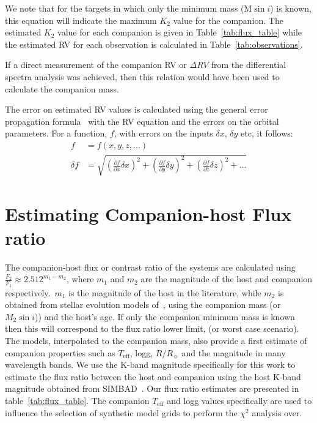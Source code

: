 We note that for the targets in which only the minimum mass (\(\textrm{M}\sin{i} \)) is known, this equation will indicate the maximum \(K_2\) value for the companion. The estimated \(K_2\) value for each companion is given in Table~\ref{tab:flux_table} while the estimated RV for each observation is calculated in Table~\ref{tab:observations}.

If a direct measurement of the companion RV or \(\Delta RV \) from the differential spectra analysis was achieved, then this relation would have been used to calculate the companion mass.

The error on estimated RV values is calculated using the general error propagation formula~\citep{ku_notes_1966} with the RV equation and the errors on the orbital parameters. For a function, \(f\), with errors on the inputs \(\delta x\), \(\delta y\) etc, it follows:
\begin{align}
	f &= f(x, y, z, ...)\\
	\delta f &= \sqrt{{\left( \frac{\partial f}{\partial x} \delta x\right)}^2 +  {\left(\frac{\partial f}{\partial y} \delta y\right)}^2 + {\left(\frac{\partial f}{\partial z} \delta z\right)}^2 + ...}
\end{align}


\section{Estimating Companion-host Flux ratio}

\label{compaion flux ration}
The companion-host flux or contrast ratio of the systems are calculated using \( \frac{F_{2}}{F_{1}} \approx 2.512^{m_{1}-m_{2}} \), where \(m_{1} \) and \(m_{2} \) are the magnitude of the host and companion respectively.\ \(m_{1} \) is the magnitude of the host in the literature, while \(m_{2} \) is obtained from stellar evolution models of~\citet{baraffe_evolutionary_2003, baraffe_new_2015}, using the companion mass (or \(M_{2}\sin{i}\))) and the host's age. If only the companion minimum mass is known then this will correspond to the flux ratio lower limit, (or worst case scenario). The models, interpolated to the companion mass, also provide a first estimate of companion properties such as \(T_{\textrm{eff}}\), logg, \(R/R_{\sun}\) and the magnitude in many wavelength bands.
We use the K-band magnitude specifically for this work to estimate the flux ratio between the host and companion using the host K-band magnitude obtained from SIMBAD~\citep{wenger_simbad_2000}. Our flux ratio estimates are presented in table~\ref{tab:flux_table}.
The companion \(T_{\textrm{eff}}\) and logg values specifically are used to influence the selection of synthetic model grids to perform the \(\chi^2\) analysis over.

